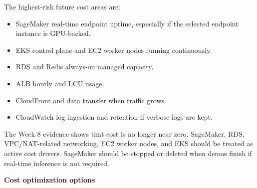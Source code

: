 The highest-risk future cost areas are:

\begin{itemize}
\tightlist
\item
  SageMaker real-time endpoint uptime, especially if the selected
  endpoint instance is GPU-backed.
\item
  EKS control plane and EC2 worker nodes running continuously.
\item
  RDS and Redis always-on managed capacity.
\item
  ALB hourly and LCU usage.
\item
  CloudFront and data transfer when traffic grows.
\item
  CloudWatch log ingestion and retention if verbose logs are kept.
\end{itemize}

The Week 8 evidence shows that cost is no longer near zero. SageMaker,
RDS, VPC/NAT-related networking, EC2 worker nodes, and EKS should be
treated as active cost drivers. SageMaker should be stopped or deleted
when demos finish if real-time inference is not required.

\vspace{0.5em}\noindent\textbf{Cost optimization options}\par

